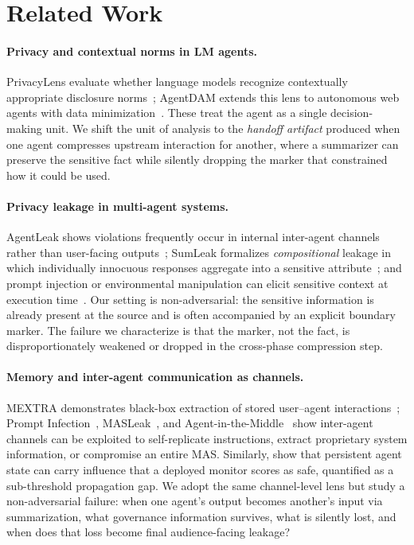 \section{Related Work}
\label{sec:related}
\paragraph{Privacy and contextual norms in LM agents.}
PrivacyLens evaluate whether language models recognize contextually appropriate disclosure norms~\citep{shao2024privacylens}; AgentDAM extends this lens to autonomous web agents with data minimization~\citep{zharmagambetov2026agentdam}. These treat the agent as a single decision-making unit. We shift the unit of analysis to the \emph{handoff artifact} produced when one agent compresses upstream interaction for another, where a summarizer can preserve the sensitive fact while silently dropping the marker that constrained how it could be used.
 
\paragraph{Privacy leakage in multi-agent systems.}
AgentLeak shows violations frequently occur in internal inter-agent channels rather than user-facing outputs~\citep{el2026agentleak}; SumLeak formalizes \emph{compositional} leakage in which individually innocuous responses aggregate into a sensitive attribute~\citep{patil2025sum}; and prompt injection or environmental manipulation can elicit sensitive context at execution time~\citep{alizadeh2025simple, liao2025eia}. Our setting is non-adversarial: the sensitive information is already present at the source and is often accompanied by an explicit boundary marker. The failure we characterize is that the marker, not the fact, is disproportionately weakened or dropped in the cross-phase compression step. 

\paragraph{Memory and inter-agent communication as channels.}
MEXTRA demonstrates black-box extraction of stored user--agent interactions~\citep{wang2025unveiling}; Prompt Infection~\citep{lee2025prompt}, MASLeak~\citep{wang2025ip}, and Agent-in-the-Middle~\citep{he2025red} show inter-agent channels can be exploited to self-replicate instructions, extract proprietary system information, or compromise an entire MAS. Similarly, \citet{wang2026state} show that persistent agent state can carry influence that a deployed monitor scores as safe, quantified as a sub-threshold propagation gap. We adopt the same channel-level lens but study a non-adversarial failure: when one agent's output becomes another's input via summarization, what governance information survives, what is silently lost, and when does that loss become final audience-facing leakage? 
 

